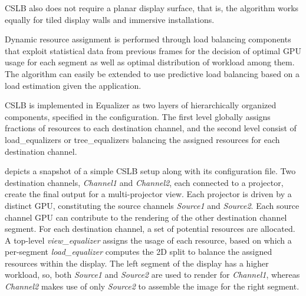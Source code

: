 CSLB also does not require a planar display surface, that is, the algorithm
works equally for tiled display walls and immersive installations.

Dynamic resource assignment is performed through load balancing components that
exploit statistical data from previous frames for the decision of optimal GPU
usage for each segment as well as optimal distribution of workload among them.
The algorithm can easily be extended to use predictive load balancing based on
a load estimation given the application.

CSLB is implemented in Equalizer as two layers of hierarchically organized
components, specified in the configuration. The first level globally assigns
fractions of resources to each destination channel, and the second level
consist of load\_equalizers or tree\_equalizers balancing the assigned
resources for each destination channel.

 depicts a snapshot of a simple CSLB setup along with its
configuration file. Two destination channels, {\em Channel1} and {\em
Channel2}, each connected to a projector, create the final output for a
multi-projector view. Each projector is driven by a distinct GPU, constituting
the source channels {\em Source1} and {\em Source2}. Each source channel GPU
can contribute to the rendering of the other destination channel segment. For
each destination channel, a set of potential resources are allocated. A
top-level {\em view\_equalizer} assigns the usage of each resource, based on
which a per-segment {\em load\_equalizer} computes the 2D split to balance the
assigned resources within the display. The left segment of the display has a
higher workload, so, both {\em Source1} and {\em Source2} are used to render
for {\em Channel1}, whereas {\em Channel2} makes use of only {\em Source2} to
assemble the image for the right segment.

